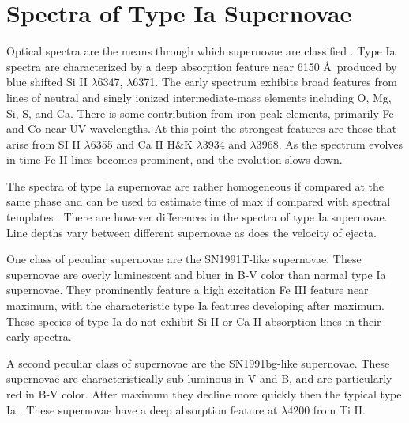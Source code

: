 \section{Spectra of Type Ia Supernovae}
Optical spectra are the means through which supernovae are classified \citep{branch01a}. Type Ia spectra are characterized by a deep absorption feature near 6150 \AA\ produced by blue shifted Si II $\lambda$6347, $\lambda$6371. The early spectrum exhibits broad features from lines of neutral and singly ionized intermediate-mass elements including O, Mg, Si, S, and Ca. There is some contribution from iron-peak elements, primarily Fe and Co near UV wavelengths. At this point the strongest features are those that arise from SI II $\lambda$6355 and Ca II H\&K $\lambda$3934 and $\lambda$3968. As the spectrum evolves in time Fe II lines becomes prominent, and the evolution slows down.

The spectra of type Ia supernovae are rather homogeneous if compared at the same phase and can be used to estimate time of max if compared with spectral templates \citep{filippenko97a}. There are however differences in the spectra of type Ia supernovae. Line depths vary between different supernovae as does the velocity of ejecta. %

One class of peculiar supernovae are the SN1991T-like supernovae. These supernovae are overly luminescent and bluer in B-V color than normal type Ia supernovae. They prominently feature a high excitation Fe III feature near maximum, with the characteristic type Ia features developing after maximum. These species of type Ia do not exhibit Si II or Ca II absorption lines in their early spectra.

A second peculiar class of supernovae are the SN1991bg-like supernovae. These supernovae are characteristically sub-luminous in V and B, and are particularly red in B-V color. After maximum they decline more quickly then the typical type Ia \citep{filippenko92b}. These supernovae have a deep absorption feature at $\lambda$4200 from Ti II.
